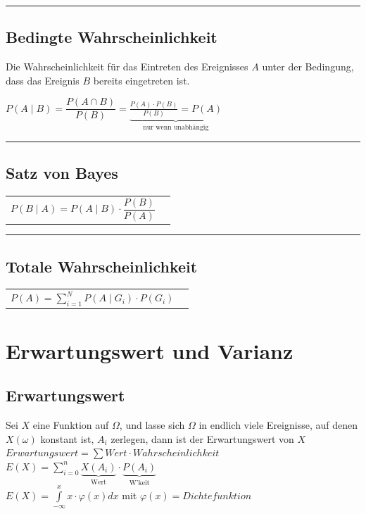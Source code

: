 \hrule

	\subsection{Bedingte Wahrscheinlichkeit  }
		Die Wahrscheinlichkeit für das Eintreten des Ereignisses $A$ unter der
		Bedingung, dass das Ereignis $B$ bereits eingetreten ist.
		\begin{center}
		$P(A\mid B)= \dfrac{P(A\cap B)}{P(B)}=\underbrace{\frac{P(A)\cdot
		P(B)}{P(B)}=P(A)}_{\text{nur wenn unabhängig}}$ 
		\end{center}

\hrule

	\subsection{Satz von Bayes  }
		\begin{tabular}{ll}
		$P(B\mid A)=P(A\mid B) \cdot\dfrac{P(B)}{P(A)}$\vspace{1mm}
		\end{tabular}

\hrule
	\subsection{Totale Wahrscheinlichkeit  }
		\begin{tabular}{ll}
        $P(A)=\sum\limits_{i=1}^N P(A\mid G_i)\cdot P(G_i)$
        \end{tabular}

\newpage
\section{Erwartungswert und Varianz}

	\subsection{Erwartungswert  }
		Sei $X$ eine Funktion auf $\Omega$, und lasse sich $\Omega$ in endlich viele
		Ereignisse, auf denen $X(\omega)$ konstant ist, $A_i$ zerlegen, dann ist der
		Erwartungswert von $X$\\
        \hspace*{5.7cm}$Erwartungswert = \sum Wert \cdot Wahrscheinlichkeit$\\
		\hspace*{7.5cm}$E(X)=\sum\limits_{i=0}^n
		\underbrace{X(A_i)}_{\text{Wert}}\cdot \underbrace{P(A_i)}_{\text{W'keit}}$\\
		\hspace*{5.7cm}$E(X) = \int\limits_{-\infty}^x x \cdot \varphi(x) dx$ mit
		$\varphi(x) = Dichtefunktion$ 

